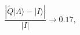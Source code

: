 \begin{equation}
\frac{\left| \tilde{ Q} |\Lambda \rangle -| I \rangle \right
  |}{| I |}  \rightarrow 0.17,
\end{equation}

